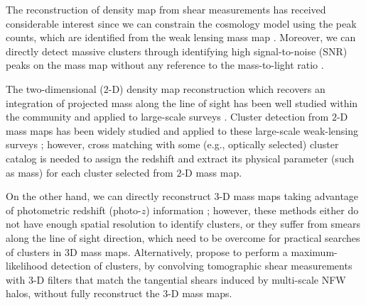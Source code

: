 \documentclass[twocolumn]{aastex63}
\begin{document}

The reconstruction of density map from shear measurements has received
considerable interest since
we can constrain the cosmology model using the peak counts, which are
identified from the weak lensing mass map
\citep{WL-massMap-peakcounts-Jain2000,WL-massMap-peakcountsAna-Fan2010,WL-massMap-peakcountsFM-Lin2016}.
Moreover, we can directly detect massive clusters through
identifying high signal-to-noise (SNR) peaks on the mass map without any
reference to the mass-to-light ratio
\citep{WL-massMap-clusDet-Schneider1996,WL-massMap-clusDet-Hamana2004}.

The two-dimensional ($2$-D) density map reconstruction which recovers an
integration of projected mass along the line of sight has been well studied
within the community
\citep{massMap-KS1993,WL-massMap-Glimpse2D-Lanusse2016,sparseBaysianMassMap-Price2020}
and applied to large-scale surveys
\citep{HSC1-massMaps,massMapDES-Chang2018,DES-SV-massMap-sparsity}.
Cluster detection from $2$-D mass maps has been widely studied and applied to
these large-scale weak-lensing surveys
\citep{WL-massMap-clusDet-CFHT-Shan2012,WL-massMap-clusDet-HSC-Miyazaki2018,WL-massMap-clusDet-HSC-Hamana2020};
however, cross matching with some (e.g., optically selected) cluster catalog is
needed to assign the redshift and extract its physical parameter (such as mass)
for each cluster selected from $2$-D mass map.

On the other hand, we can directly reconstruct $3$-D mass maps taking advantage
of photometric redshift (photo-$z$) information
\citep{LSS-massMap-Wiener-Simon2009,WL-massMap-VanderPlas2011}; however, these
methods either do not have enough spatial resolution to identify clusters, or
they suffer from smears along the line of sight direction, which need to be
overcome for practical searches of clusters in 3D mass maps.  Alternatively,
\citet{WL-clusDet-Hennawi2005} propose to perform a maximum-likelihood
detection of clusters, by convolving tomographic shear measurements with $3$-D
filters that match the tangential shears induced by multi-scale NFW halos,
without fully reconstruct the $3$-D mass maps.
\end{document}
